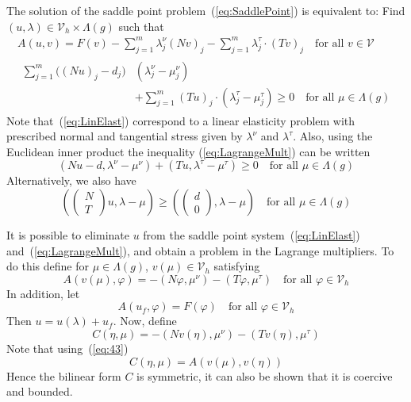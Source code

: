 \documentclass[12pt,a4paper]{article}
\numberwithin{equation}{section}
\numberwithin{table}{section}
\numberwithin{figure}{section}
\newcommand{\V}{\ensuremath{\mathcal{V}}}
\newcommand{\Vh}{{\mathcal V}_h}
\newcommand{\sumjm}{\sum_{j=1}^m}
\renewcommand{\phi}{\varphi}
\newcommand{\qforall}{\quad\text{for all }}
\begin{document}
The solution of the saddle point problem~(\ref{eq:SaddlePoint}) is equivalent to:  Find
$(u,\lambda)\in \Vh\times\Lambda(g)$ such that
\begin{gather}
  \label{eq:LinElast}
  A(u,v) = F(v) - \sumjm \lambda^\nu_j (Nv)_j - \sumjm \lambda^\tau_j \cdot (Tv)_j
  \qforall v\in\V \\
  \begin{split}
  \sumjm \bigl((Nu)_j - d_j\bigr)&(\lambda^\nu_j - \mu^\nu_j) \\ 
  &+ \sumjm (Tu)_j \cdot (\lambda^\tau_j - \mu^\tau_j) \ge 0 \qforall \mu \in \Lambda(g)    
  \end{split}
  \label{eq:LagrangeMult}
\end{gather}
Note that~(\ref{eq:LinElast}) correspond to a linear elasticity problem with prescribed
normal and tangential stress given by $\lambda^\nu$ and $\lambda^\tau$.  Also, using the
Euclidean inner product the inequality (\ref{eq:LagrangeMult}) can be written
\begin{equation}
  \label{eq:LagrangeMultInner}
  (N u - d, \lambda^\nu-\mu^\nu) + (T u, \lambda^\tau-\mu^\tau) \ge 0
  \qforall \mu \in \Lambda(g)
\end{equation}
Alternatively, we also have
\begin{equation}
  \label{eq:20}
  (
  \begin{pmatrix}
    N \\ T
  \end{pmatrix}
  u, \lambda - \mu) \ge (
  \begin{pmatrix}
    d \\ 0
  \end{pmatrix}, \lambda - \mu) \qforall \mu\in\Lambda(g)
\end{equation}

It is possible to eliminate $u$ from the saddle point system~(\ref{eq:LinElast})
and~(\ref{eq:LagrangeMult}), and obtain a problem in the Lagrange multipliers.  To do this
define for $\mu\in\Lambda(g)$, $v(\mu)\in\Vh$ satisfying
\begin{equation}
  \label{eq:43}
  A(v(\mu), \phi) = -(N\phi, \mu^\nu) - (T\phi, \mu^\tau)
  \qforall \phi\in\Vh
\end{equation}
In addition, let
\begin{equation}
  \label{eq:42}
  A(u_f, \phi) = F(\phi)\qforall \phi\in\Vh
\end{equation}
Then $u=u(\lambda)+u_f$.  Now, define
\begin{equation}
  \label{eq:45}
  C(\eta, \mu) = -(Nv(\eta), \mu^\nu) - (Tv(\eta), \mu^\tau)
\end{equation}
Note that using~(\ref{eq:43})
\begin{equation}
  \label{eq:47}
  C(\eta, \mu) = A(v(\mu), v(\eta))
\end{equation}
Hence the bilinear form $C$ is symmetric, it can also be shown that it is coercive and
bounded.
\end{document}
